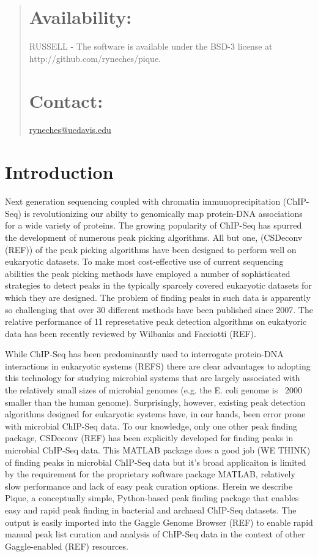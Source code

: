 \documentclass{bioinfo} %
\begin{document}
{\begin{abstract}
\section{Availability:} RUSSELL - The software is available under the
BSD-3 license at http://github.com/ryneches/pique.

\section{Contact:} \href{ryneches@ucdavis.edu}{ryneches@ucdavis.edu}

\end{abstract}

\section{Introduction} Next generation sequencing coupled with chromatin
immunoprecipitation (ChIP-Seq) is revolutionizing our abilty to
genomically map protein-DNA associations for a wide variety of proteins.
 The growing popularity of ChIP-Seq has spurred the  development of
numerous peak picking algorithms. All but one, (CSDeconv (REF)) of the
peak picking algorithms have been designed to perform well on eukaryotic
datasets.  To make most cost-effective use of current sequencing
abilities the peak picking methods have employed a number of
sophisticated strategies to detect peaks in the typically sparcely
covered eukaryotic datasets for which they are designed.  The problem of
finding peaks in such data is apparently so challenging that over 30
different methods have been published since 2007.  The relative
performance of 11 represetative peak detection algorithms on eukatyoric
data has been recently reviewed by Wilbanks and Facciotti (REF).

While ChIP-Seq has been predominantly used to interrogate protein-DNA
interactions in eukaryotic systems (REFS) there are clear advantages to
adopting this technology for studying microbial systems that are largely
associated with the relatively small sizes of microbial genomes (e.g.
the E. coli genome is ~2000 smaller than the human genome). 
Surprisingly, however, existing peak detection algorithms designed for
eukaryotic systems have, in our hands, been error prone with microbial
ChIP-Seq data.  To our knowledge, only one other peak finding package,
CSDeconv (REF) has been explicitly developed for finding peaks in
microbial ChIP-Seq data.  This MATLAB package does a good job (WE THINK)
of finding peaks in microbial ChIP-Seq data but it's broad applicaiton
is limited by the requirement for the proprietary software package
MATLAB, relatively slow performance and lack of easy peak curation
options.  Herein we describe Pique, a conceptually simple, Python-based
peak finding package that enables easy and rapid peak finding in
bacterial and archaeal ChIP-Seq datasets.  The output is easily imported
into the Gaggle Genome Browser (REF) to enable rapid manual peak list
curation and analysis of ChIP-Seq data in the context of other
Gaggle-enabled (REF) resources.

}
\end{document}
